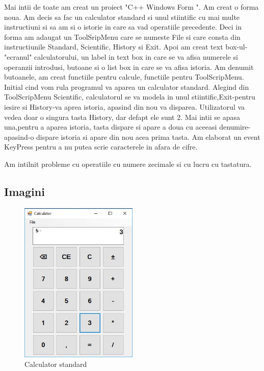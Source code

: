 Mai intii de toate am creat un proiect "C++ Windows Form ". Am creat o forma noua. Am decis sa fac un calculator standard si unul stiintific cu mai multe instructiuni si sa am si o istorie in care sa vad operatiile precedente. Deci in forma am adaugat un ToolSripMenu care se numeste File si care consta din instructiunile Standard, Scientific, History si Exit. Apoi am creat text box-ul-"ecranul" calculatorului, un label in text box in care se va afisa numerele si operanzii introdusi, butoane si o list box in care se va afisa istoria. Am denumit butoanele, am creat functiile pentru calcule, functiile pentru ToolScripMenu. Initial cind vom rula programul va aparea un calculator standard. Alegind din ToolScripMenu Scientific, calculatorul se va modela in unul stiintific,Exit-pentru iesire si History-va aprea istoria, apasind din nou va disparea. Utilizatorul va vedea doar o singura tasta History, dar defapt ele sunt 2. Mai intii se apasa una,pentru a aparea istoria, tasta dispare si apare a doua cu aceeasi denumire-apasind-o dispare istoria si apare din nou acea prima tasta. Am elaborat un event KeyPress pentru a nu putea scrie caracterele in afara de cifre.

Am intilnit probleme cu operatiile cu numere zecimale si cu lucru cu tastatura.  
 



\subsection{Imagini}




\begin{figure}[!ht]
	
	\centering
	
	\includegraphics[width=0.5\textwidth]{Cattura.JPG}
	
	\caption{Calculator standard}
	
	\label{Im_label}
	
\end{figure}

